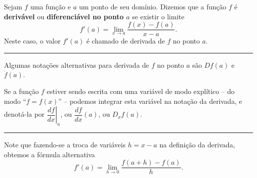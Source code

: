 \begin{definition}
	Sejam $f$ uma função e $a$ um ponto de seu domínio. Dizemos que a função $f$ é \textbf{derivável} ou \textbf{diferenciável no ponto $a$} se existir o limite
	\[f'(a)=\lim_{x\to a}\dfrac{f(x)-f(a)}{x-a}.\]
	Neste caso, o valor $f'(a)$ é chamado de derivada de $f$ no ponto $a$.

	\hrule
	
	Algumas notações alternativas para derivada de $f$ no ponto $a$ são $Df(a)$ e $\dot{f}(a)$.

	Se a função $f$ estiver sendo escrita com uma variável de modo explítico -- do modo ``$f=f(x)$'' -- podemos integrar esta variável na notação da derivada, e denotá-la por $\left.\dfrac{df}{dx}\right|_a$, ou $\dfrac{df}{dx}(a)$, ou $D_xf(a)$.

	\hrule
	
	Note que fazendo-se a troca de variáveis $h=x-a$ na definição da derivada, obtemos a fórmula alternativa
	\[f'(a)=\lim_{h\to 0}\dfrac{f(a+h)-f(a)}{h}.\]
\end{definition}